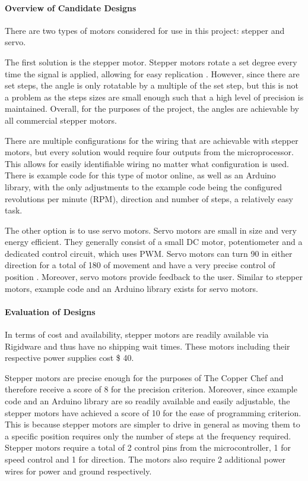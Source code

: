 \documentclass[11pt]{article}
\newcommand{\subsubsubsection}[1]{\paragraph{#1}\mbox{}}
\begin{document}
\subsubsubsection{Overview of Candidate Designs}

\noindent
There are two types of motors considered for use in this project: stepper and servo.

The first solution is the stepper motor.
Stepper motors rotate a set degree every time the signal is applied, allowing for easy replication \cite{se8}.
However, since there are set steps, the angle is only rotatable by a multiple of the set step, but this is not a problem as the steps sizes are small enough such that a high level of precision is maintained.
Overall, for the purposes of the project, the angles are achievable by all commercial stepper motors.

There are multiple configurations for the wiring that are achievable with stepper motors, but every solution would require four outputs from the microprocessor.
This allows for easily identifiable wiring no matter what configuration is used.
There is example code for this type of motor online, as well as an Arduino library, with the only adjustments to the example code being the configured revolutions per minute (RPM), direction and number of steps, a relatively easy task.

The other option is to use servo motors.
Servo motors are small in size and very energy efficient.
They generally consist of a small DC motor, potentiometer  and a dedicated control circuit, which uses PWM.
Servo motors can turn 90 \degree in either direction for a total of 180 \degree of movement and have a very precise control of position \cite{se9}.
Moreover, servo motors provide feedback to the user. Similar to stepper motors, example code and an Arduino library exists for servo motors. 

\subsubsubsection{Evaluation of Designs}

\noindent
In terms of cost and availability, stepper motors are readily available via Rigidware and thus have no shipping wait times.
These motors including their respective power supplies cost \$ 40.

Stepper motors are precise enough for the purposes of The Copper Chef and therefore receive a score of 8 for the precision criterion.
Moreover, since example code and an Arduino library are so readily available and easily adjustable, the stepper motors have achieved a score of 10 for the ease of programming criterion.
This is because stepper motors are simpler to drive in general as moving them to a specific position requires only the number of steps at the frequency required.
Stepper motors require a total of 2 control pins from the microcontroller, 1 for speed control and 1 for direction.
The motors also require 2 additional power wires for power and ground respectively.
\end{document}

